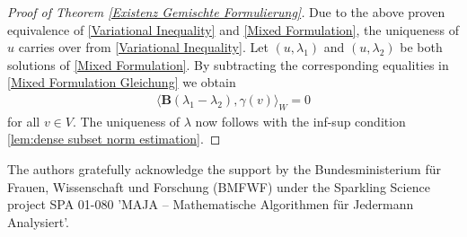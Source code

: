 \documentclass[12pt,twoside,reqno]{amsart}
\theoremstyle{definition}
\numberwithin{equation}{section}
\newcommand{\B} {\bm{B}}
\begin{document}
\begin{proof}[Proof of Theorem \ref{Existenz Gemischte Formulierung}]
    Due to the above proven equivalence of \eqref{Variational Inequality} and \eqref{Mixed Formulation}, the uniqueness of $u$ carries over from \eqref{Variational Inequality}. Let $(u,\lambda_1)$ and $(u,\lambda_2)$ be both solutions of \eqref{Mixed Formulation}. By subtracting the corresponding equalities in \eqref{Mixed Formulation Gleichung} we obtain
        \begin{align*}%
            \langle \B(\lambda_1-\lambda_2),\gamma(v)\rangle_W = 0
        \end{align*}
        for all $v\in V$.
        The uniqueness of $\lambda$ now follows with the inf-sup condition \eqref{lem:dense subset norm estimation}.
\end{proof}
%






\vskip 6mm

\noindent   
The authors gratefully acknowledge the support by the Bundesministerium f\"{u}r Frauen, Wissenschaft und Forschung (BMFWF) under the Sparkling Science project SPA 01-080 'MAJA -- Mathematische Algorithmen für Jedermann Analysiert'.
\end{document}
